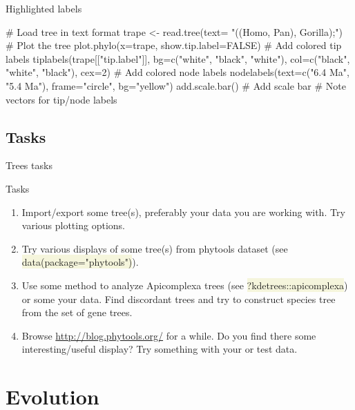 \documentclass[compress, xelatex, 11pt, xcolor=svgnames, aspectratio=169,
	hyperref={
		bookmarks=true,
		unicode=true,
		colorlinks=true,
		pdftitle={Molecular data in R},
		plainpages=false,
		pdfauthor={Vojtech Zeisek},
		pdfsubject={Course about phylogeny and evolution in R},
		pdfcreator={XeLaTeX},
		pdfkeywords={R, evolution, phylogeny, molecular data},
		linkcolor=Crimson, %
		anchorcolor=Magenta, %
		citecolor=Magenta, %
		filecolor=Magenta, %
		menucolor=Magenta, %
		urlcolor=DodgerBlue, %
		},
	url={hyphens, lowtilde} %
	]{beamer}
\renewcommand{\texttt}[1]{\colorbox{Beige}{{\ttfamily #1}}}
\begin{document}
\begin{frame}[fragile]{Highlighted labels}
	\begin{multicols}{2}
		\vfill
		\begin{center}
			\texttt{[image: highlight.png]}
		\end{center}
		\vfill
		\begin{spluscode}
    # Load tree in text format
    trape <- read.tree(text=
      "((Homo, Pan), Gorilla);")
    # Plot the tree
    plot.phylo(x=trape,
      show.tip.label=FALSE)
    # Add colored tip labels
    tiplabels(trape[["tip.label"]],
      bg=c("white", "black",
      "white"), col=c("black",
      "white", "black"), cex=2)
    # Add colored node labels
    nodelabels(text=c("6.4 Ma",
      "5.4 Ma"), frame="circle",
      bg="yellow")
    add.scale.bar() # Add scale bar
    # Note vectors for tip/node labels
		\end{spluscode}
	\end{multicols}
\end{frame}

\subsection{Tasks}

\begin{frame}{Trees tasks}
	\begin{exampleblock}{Tasks}
		\begin{enumerate}
			\item Import/export some tree(s), preferably your data you are working with. Try various plotting options.
			\item Try various displays of some tree(s) from phytools dataset (see \texttt{data(package="phytools")}).
			\item Use some method to analyze Apicomplexa trees (see \texttt{?kdetrees::apicomplexa}) or some your data. Find discordant trees and try to construct species tree from the set of gene trees.
			\item Browse \url{http://blog.phytools.org/} for a while. Do you find there some interesting/useful display? Try something with your or test data.
		\end{enumerate}
	\end{exampleblock}
\end{frame}

\section{Evolution}
\end{document}
